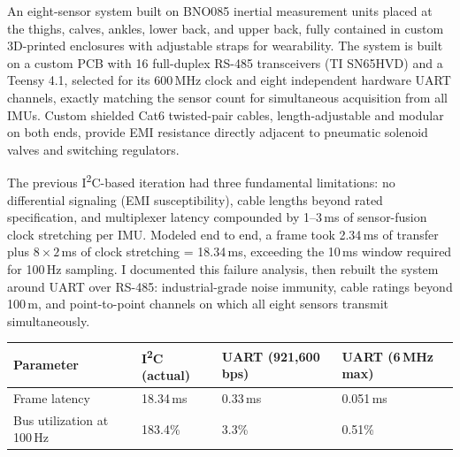 \documentclass[10pt,letterpaper]{article}
\begin{document}
An eight-sensor system built on BNO085 inertial measurement units placed at
the thighs, calves, ankles, lower back, and upper back, fully contained in
custom 3D-printed enclosures with adjustable straps for wearability. The
system is built on a custom PCB with 16 full-duplex RS-485 transceivers
(TI SN65HVD) and a Teensy 4.1, selected for its 600\,MHz clock and eight
independent hardware UART channels, exactly matching the sensor count for
simultaneous acquisition from all IMUs. Custom shielded Cat6 twisted-pair
cables, length-adjustable and modular on both ends, provide EMI resistance
directly adjacent to pneumatic solenoid valves and switching regulators.

The previous I\textsuperscript{2}C-based iteration had three fundamental
limitations: no differential signaling (EMI susceptibility), cable lengths
beyond rated specification, and multiplexer latency compounded by 1--3\,ms
of sensor-fusion clock stretching per IMU. Modeled end to end, a frame took
2.34\,ms of transfer plus $8 \times 2$\,ms of clock stretching =
18.34\,ms, exceeding the 10\,ms window required for 100\,Hz sampling. I
documented this failure analysis, then rebuilt the system around UART over
RS-485: industrial-grade noise immunity, cable ratings beyond 100\,m, and
point-to-point channels on which all eight sensors transmit simultaneously.

\begin{center}\small
\begin{tabularx}{\textwidth}{@{}lLLL@{}}
\toprule
\textbf{Parameter} & \textbf{I\textsuperscript{2}C (actual)} &
\textbf{UART (921{,}600\,bps)} & \textbf{UART (6\,MHz max)} \\
\midrule
Frame latency               & 18.34\,ms & 0.33\,ms & 0.051\,ms \\
Bus utilization at 100\,Hz  & 183.4\%   & 3.3\%    & 0.51\% \\
\bottomrule
\end{tabularx}
\end{center}
\end{document}
